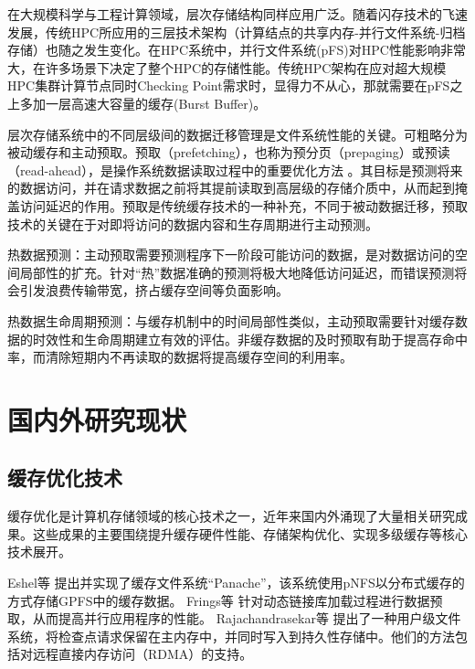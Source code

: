 在大规模科学与工程计算领域，层次存储结构同样应用广泛。随着闪存技术的飞速发展，传统HPC所应用的三层技术架构（计算结点的共享内存-并行文件系统-归档存储）也随之发生变化。在HPC系统中，并行文件系统(pFS)对HPC性能影响非常大，在许多场景下决定了整个HPC的存储性能。传统HPC架构在应对超大规模HPC集群计算节点同时Checking Point需求时，显得力不从心，那就需要在pFS之上多加一层高速大容量的缓存(Burst Buffer)。

层次存储系统中的不同层级间的数据迁移管理是文件系统性能的关键。可粗略分为被动缓存和主动预取。预取（prefetching），也称为预分页（prepaging）或预读（read-ahead），是操作系统数据读取过程中的重要优化方法
\cite{Reducing_File_System_Latency_using_a_Predictive_Approach}
\cite{Group_based_management_of_distributed_file_caches}
\cite{A_data_mining_algorithm_for_generalized_web_prefetching}
。其目标是预测将来的数据访问，并在请求数据之前将其提前读取到高层级的存储介质中，从而起到掩盖访问延迟的作用。预取是传统缓存技术的一种补充，不同于被动数据迁移，预取技术的关键在于对即将访问的数据内容和生存周期进行主动预测。

热数据预测：主动预取需要预测程序下一阶段可能访问的数据，是对数据访问的空间局部性的扩充。针对“热”数据准确的预测将极大地降低访问延迟，而错误预测将会引发浪费传输带宽，挤占缓存空间等负面影响。

热数据生命周期预测：与缓存机制中的时间局部性类似，主动预取需要针对缓存数据的时效性和生命周期建立有效的评估。非缓存数据的及时预取有助于提高存命中率，而清除短期内不再读取的数据将提高缓存空间的利用率。



\section{国内外研究现状}
\subsection{缓存优化技术}
缓存优化是计算机存储领域的核心技术之一，近年来国内外涌现了大量相关研究成果。这些成果的主要围绕提升缓存硬件性能、存储架构优化、实现多级缓存等核心技术展开。

Eshel等\cite{Panache}
提出并实现了缓存文件系统“Panache”，该系统使用pNFS以分布式缓存的方式存储GPFS中的缓存数据。
Frings等\cite{Massively_Parallel_Loading}
针对动态链接库加载过程进行数据预取，从而提高并行应用程序的性能。
Rajachandrasekar等\cite{1PB}
提出了一种用户级文件系统，将检查点请求保留在主内存中，并同时写入到持久性存储中。他们的方法包括对远程直接内存访问（RDMA）的支持。

